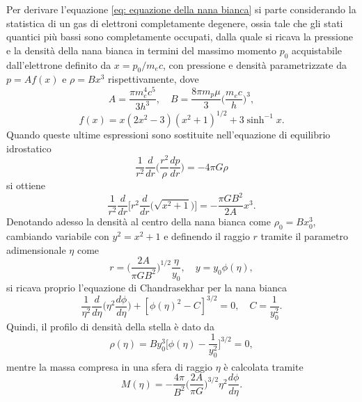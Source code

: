 \documentclass{article}
\newcommand{\supcite}[2][]{\textsuperscript{\cite[#1]{#2}}}
\numberwithin{equation}{section}
\begin{document}
Per derivare l'equazione \eqref{eq: equazione della nana bianca} si parte considerando la statistica di un gas di elettroni completamente degenere, ossia tale che gli stati quantici più bassi sono completamente occupati, dalla quale si ricava la pressione e la densità della nana bianca in termini del massimo momento $p_0$ acquistabile dall'elettrone definito da $x = p_0/m_ec$, con pressione e densità parametrizzate da $p = Af(x)$ e $\rho = Bx^3$ rispettivamente, dove
\begin{equation}
    A = \frac{\pi m_e^4c^5}{3h^3},\quad B = \frac{8\pi m_p\mu}{3}\bigg(\frac{m_ec}{h}\bigg)^3,
\end{equation}
\begin{equation}
    f(x) = x(2x^2 - 3)(x^2 + 1)^{1/2} + 3\sinh^{-1}{x}.
\end{equation}
Quando queste ultime espressioni sono sostituite nell'equazione di equilibrio idrostatico
\begin{equation}
     \frac{1}{r^2}\frac{d}{dr}\bigg(\frac{r^2}{\rho}\frac{dp}{dr}\bigg) = -4\pi G\rho
\end{equation}
si ottiene
\begin{equation}
    \frac{1}{r^2}\frac{d}{dr}\bigg[r^2\frac{d}{dr}\bigg(\sqrt{x^2 + 1}\bigg)\bigg] = -\frac{\pi GB^2}{2A}x^3.
\end{equation}
Denotando adesso la densità al centro della nana bianca come $\rho_0 = Bx_0^3$, cambiando variabile con $y^2 = x^2 + 1$ e definendo il raggio $r$ tramite il parametro adimensionale $\eta$ come
\begin{equation}
    r = \bigg(\frac{2A}{\pi GB^2}\bigg)^{1/2}\frac{\eta}{y_0},\quad y = y_0\phi(\eta),
\end{equation}
si ricava proprio l'equazione di Chandrasekhar per la nana bianca
\begin{equation}
    \frac{1}{\eta^2}\frac{d}{d\eta}\bigg(\eta^2\frac{d\phi}{d\eta}\bigg) + [\phi(\eta)^2 - C]^{3/2} = 0,\quad C = \frac{1}{y_0^2}.
\end{equation}
Quindi, il profilo di densità della stella è dato da 
\begin{equation}
    \rho(\eta) = By_0^3\bigg[\phi(\eta) - \frac{1}{y_0^2}\bigg]^{3/2} = 0,
\end{equation}
mentre la massa\supcite[pg.~211]{chandrasekhar1935} compresa in una sfera di raggio $\eta$ è calcolata tramite 
\begin{equation}
\label{eq; massa nana bianca generica}
    M(\eta) = -\frac{4\pi}{B^2}\bigg(\frac{2A}{\pi G}\bigg)^{3/2}\eta^2\frac{d\phi}{d\eta}.
\end{equation}
\end{document}
